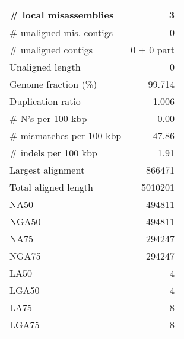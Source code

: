 \documentclass[12pt,a4paper]{article}
\begin{document}
\begin{table}[ht]
\begin{center}
\begin{tabular}{|l*{1}{|r}|}
\# local misassemblies & 3 \\ \hline
\# unaligned mis. contigs & 0 \\ \hline
\# unaligned contigs & 0 + 0 part \\ \hline
Unaligned length & 0 \\ \hline
Genome fraction (\%) & 99.714 \\ \hline
Duplication ratio & 1.006 \\ \hline
\# N's per 100 kbp & 0.00 \\ \hline
\# mismatches per 100 kbp & 47.86 \\ \hline
\# indels per 100 kbp & 1.91 \\ \hline
Largest alignment & 866471 \\ \hline
Total aligned length & 5010201 \\ \hline
NA50 & 494811 \\ \hline
NGA50 & 494811 \\ \hline
NA75 & 294247 \\ \hline
NGA75 & 294247 \\ \hline
LA50 & 4 \\ \hline
LGA50 & 4 \\ \hline
LA75 & 8 \\ \hline
LGA75 & 8 \\ \hline
\end{tabular}
\end{center}
\end{table}
\end{document}
